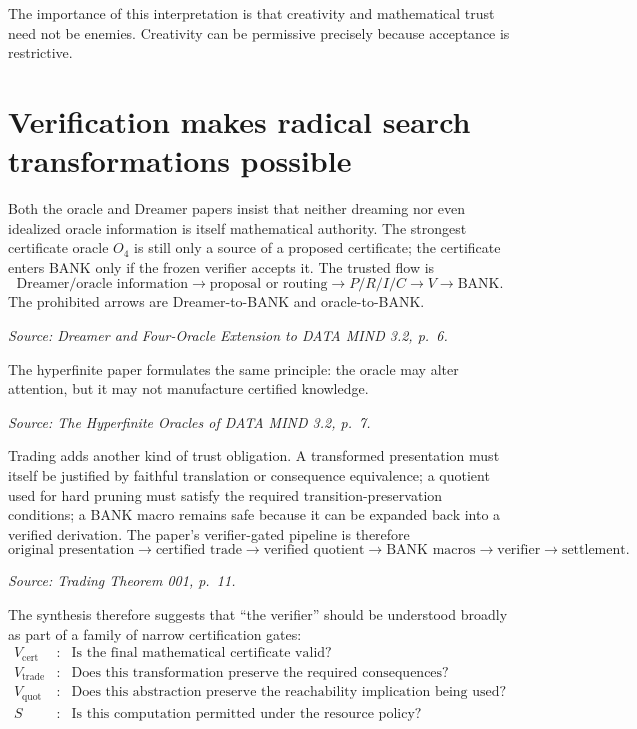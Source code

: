 \documentclass[11pt]{article}
\newcommand{\src}[1]{\par\smallskip\noindent\textit{Source: #1}\normalsize}
\newcommand{\BANK}{\ensuremath{\mathrm{BANK}}}
\begin{document}
The importance of this interpretation is that creativity and mathematical trust need not be enemies. Creativity can be permissive precisely because acceptance is restrictive.

\section{Verification makes radical search transformations possible}

Both the oracle and Dreamer papers insist that neither dreaming nor even idealized oracle information is itself mathematical authority. The strongest certificate oracle $O_4$ is still only a source of a proposed certificate; the certificate enters BANK only if the frozen verifier accepts it. The trusted flow is
\[
\text{Dreamer/oracle information}
\rightarrow
\text{proposal or routing}
\rightarrow
P/R/I/C
\rightarrow
V
\rightarrow
\BANK.
\]
The prohibited arrows are Dreamer-to-BANK and oracle-to-BANK.
\src{\emph{Dreamer and Four-Oracle Extension to DATA MIND 3.2}, p.~6.}

The hyperfinite paper formulates the same principle: the oracle may alter attention, but it may not manufacture certified knowledge.
\src{\emph{The Hyperfinite Oracles of DATA MIND 3.2}, p.~7.}

Trading adds another kind of trust obligation. A transformed presentation must itself be justified by faithful translation or consequence equivalence; a quotient used for hard pruning must satisfy the required transition-preservation conditions; a BANK macro remains safe because it can be expanded back into a verified derivation. The paper's verifier-gated pipeline is therefore
\[
\text{original presentation}
\rightarrow
\text{certified trade}
\rightarrow
\text{verified quotient}
\rightarrow
\text{BANK macros}
\rightarrow
\text{verifier}
\rightarrow
\text{settlement}.
\]
\src{\emph{Trading Theorem 001}, p.~11.}

The synthesis therefore suggests that ``the verifier'' should be understood broadly as part of a family of narrow certification gates:
\[
\begin{array}{rcl}
V_{\mathrm{cert}} &:& \text{Is the final mathematical certificate valid?}\\
V_{\mathrm{trade}} &:& \text{Does this transformation preserve the required consequences?}\\
V_{\mathrm{quot}} &:& \text{Does this abstraction preserve the reachability implication being used?}\\
S &:& \text{Is this computation permitted under the resource policy?}
\end{array}
\]
\end{document}
